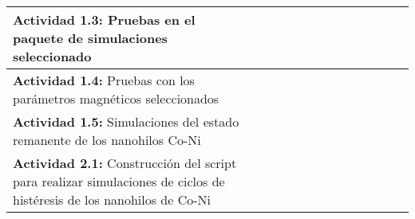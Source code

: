 \begin{table}[!hpt]
{\begin{tabular}{|l|llllllllllll|}
            \hline 
            \multicolumn{1}{|p{114.4275pt}}{\raggedright {\bfseries Actividad 1.3:} Pruebas en el paquete de simulaciones seleccionado} & \multicolumn{1}{|p{31.618126pt}}{} & \multicolumn{1}{|p{31.618126pt}}{} & \multicolumn{1}{|p{30.1125pt}}{\centering {\bfseries $\otimes$}} & \multicolumn{1}{|p{30.1125pt}}{\centering {\bfseries $\otimes$}} & \multicolumn{1}{|p{30.1125pt}}{\centering {\bfseries $\otimes$}} & \multicolumn{1}{|p{30.1125pt}}{} & \multicolumn{1}{|p{30.1125pt}}{} & \multicolumn{1}{|p{30.1125pt}}{} & \multicolumn{1}{|p{30.1125pt}}{} & \multicolumn{1}{|p{30.1125pt}}{} & \multicolumn{1}{|p{30.1125pt}}{} & \multicolumn{1}{|p{30.1125pt}|}{}\\ 
            \hline 
            \multicolumn{1}{|p{114.4275pt}}{\raggedright {\bfseries Actividad 1.4:} Pruebas con los par\'ametros magn\'eticos seleccionados} & \multicolumn{1}{|p{31.618126pt}}{} & \multicolumn{1}{|p{31.618126pt}}{} & \multicolumn{1}{|p{30.1125pt}}{} & \multicolumn{1}{|p{30.1125pt}}{} & \multicolumn{1}{|p{30.1125pt}}{\centering {\bfseries $\otimes$}} & \multicolumn{1}{|p{30.1125pt}}{\centering {\bfseries $\otimes$}} & \multicolumn{1}{|p{30.1125pt}}{\centering {\bfseries $\otimes$}} & \multicolumn{1}{|p{30.1125pt}}{\centering {\bfseries $\otimes$}} & \multicolumn{1}{|p{30.1125pt}}{} & \multicolumn{1}{|p{30.1125pt}}{} & \multicolumn{1}{|p{30.1125pt}}{} & \multicolumn{1}{|p{30.1125pt}|}{}\\ 
            \hline 
            \multicolumn{1}{|p{114.4275pt}}{\raggedright {\bfseries Actividad 1.5:} Simulaciones del estado remanente de los nanohilos Co-Ni} & \multicolumn{1}{|p{31.618126pt}}{} & \multicolumn{1}{|p{31.618126pt}}{} & \multicolumn{1}{|p{30.1125pt}}{} & \multicolumn{1}{|p{30.1125pt}}{} & \multicolumn{1}{|p{30.1125pt}}{} & \multicolumn{1}{|p{30.1125pt}}{} & \multicolumn{1}{|p{30.1125pt}}{} & \multicolumn{1}{|p{30.1125pt}}{\centering {\bfseries $\otimes$}} & \multicolumn{1}{|p{30.1125pt}}{\centering {\bfseries $\otimes$}} & \multicolumn{1}{|p{30.1125pt}}{} & \multicolumn{1}{|p{30.1125pt}}{} & \multicolumn{1}{|p{30.1125pt}|}{}\\ 
            \hline 
            \multicolumn{1}{|p{114.4275pt}}{\raggedright {\bfseries Actividad 2.1:} Construcci\'on del script para realizar simulaciones de ciclos de hist\'eresis de los nanohilos de Co-Ni } & \multicolumn{1}{|p{31.618126pt}}{} & \multicolumn{1}{|p{31.618126pt}}{} & \multicolumn{1}{|p{30.1125pt}}{} & \multicolumn{1}{|p{30.1125pt}}{} & \multicolumn{1}{|p{30.1125pt}}{} & \multicolumn{1}{|p{30.1125pt}}{} & \multicolumn{1}{|p{30.1125pt}}{} & \multicolumn{1}{|p{30.1125pt}}{\centering {\bfseries $\otimes$}} & \multicolumn{1}{|p{30.1125pt}}{\centering {\bfseries $\otimes$}} & \multicolumn{1}{|p{30.1125pt}}{\centering {\bfseries $\otimes$}} & \multicolumn{1}{|p{30.1125pt}}{} & \multicolumn{1}{|p{30.1125pt}|}{}\\ 

\end{tabular}}
\end{table}
